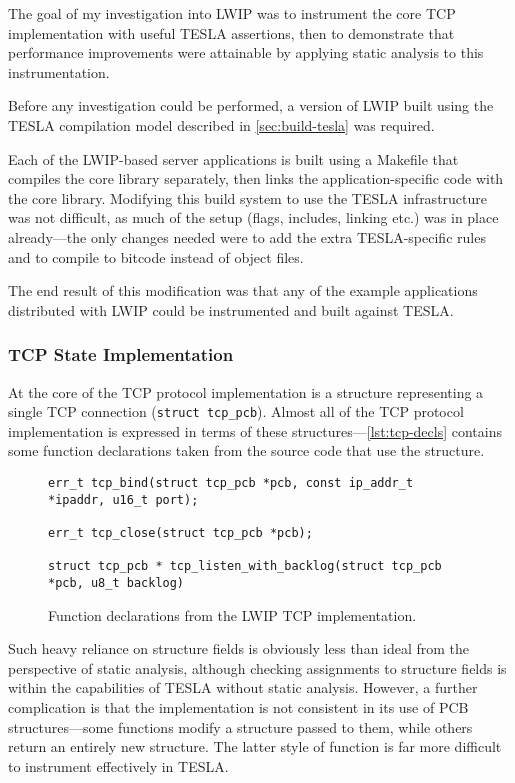The goal of my investigation into LWIP was to instrument the core TCP
implementation with useful TESLA assertions, then to demonstrate that
performance improvements were attainable by applying static analysis to
this instrumentation.

Before any investigation could be performed, a version of LWIP built
using the TESLA compilation model described in \autoref{sec:build-tesla}
was required.

Each of the LWIP-based server applications is built using a Makefile
that compiles the core library separately, then links the
application-specific code with the core library. Modifying this build
system to use the TESLA infrastructure was not difficult, as much of the
setup (flags, includes, linking etc.) was in place already---the only
changes needed were to add the extra TESLA-specific rules and to compile
to bitcode instead of object files.

The end result of this modification was that any of the example applications
distributed with LWIP could be instrumented and built against TESLA.

\subsubsection{TCP State Implementation}

At the core of the TCP protocol implementation is a structure
representing a single TCP connection (\texttt{struct tcp_pcb}).
Almost all of the TCP protocol implementation is expressed in terms of
these structures---\autoref{lst:tcp-decls} contains some function
declarations taken from the source code that use the structure.

\begin{figure}
  \begin{verbatim}
err_t tcp_bind(struct tcp_pcb *pcb, const ip_addr_t *ipaddr, u16_t port);

err_t tcp_close(struct tcp_pcb *pcb);

struct tcp_pcb * tcp_listen_with_backlog(struct tcp_pcb *pcb, u8_t backlog)
  \end{verbatim}
  \caption{Function declarations from the LWIP TCP implementation.}
  \label{lst:tcp-decls}
\end{figure}

Such heavy reliance on structure fields is obviously less than ideal
from the perspective of static analysis, although checking assignments
to structure fields is within the capabilities of TESLA without static
analysis. However, a further complication is that the implementation is
not consistent in its use of PCB structures---some functions modify a
structure passed to them, while others return an entirely new structure.
The latter style of function is far more difficult to instrument
effectively in TESLA.

